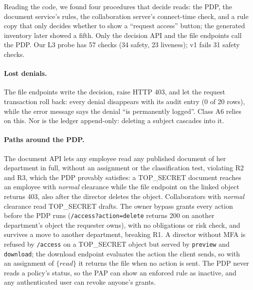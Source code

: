 \documentclass[sigconf,review,anonymous]{acmart}
\begin{document}
Reading the code, we found four procedures that decide reads: the PDP, the document service's rules, the
collaboration server's connect-time check, and a rule copy that only decides whether to show a ``request access''
button; the generated inventory later showed a fifth. Only the decision API and the file endpoints call the PDP. Our
L3 probe has 57 checks (34 safety, 23 liveness); v1 fails 31 safety checks.

\paragraph{Lost denials.} The file endpoints write the decision, raise HTTP 403, and let the request transaction roll
back: every denial disappears with its audit entry (0 of 20 rows), while the error message says the denial ``is
permanently logged''. Class A6 relies on this. Nor is the ledger append-only: deleting a subject cascades into it.

\paragraph{Paths around the PDP\@.} The document API lets any employee read any published document of her
department in full, without an assignment or the classification test, violating R2 and R3, which the PDP provably
satisfies: a TOP\_SECRET document reaches an employee with \emph{normal} clearance while the file endpoint on the
linked object returns 403, also after the director deletes the object. Collaborators with \emph{normal} clearance
read TOP\_SECRET drafts. The owner bypass grants every action before the PDP runs (\texttt{/access?action=delete}
returns 200 on another department's object the requester owns), with no obligations or risk check, and survives a
move to another department, breaking R1. A director without MFA is refused by \texttt{/access} on a TOP\_SECRET
object but served by \texttt{preview} and \texttt{download}; the download endpoint evaluates the action the client
sends, so with an assignment of $\{\mathit{read}\}$ it returns the file when no action is sent. The PDP never reads
a policy's status, so the PAP can show an enforced rule as inactive, and any authenticated user can revoke anyone's
grants.
\end{document}
